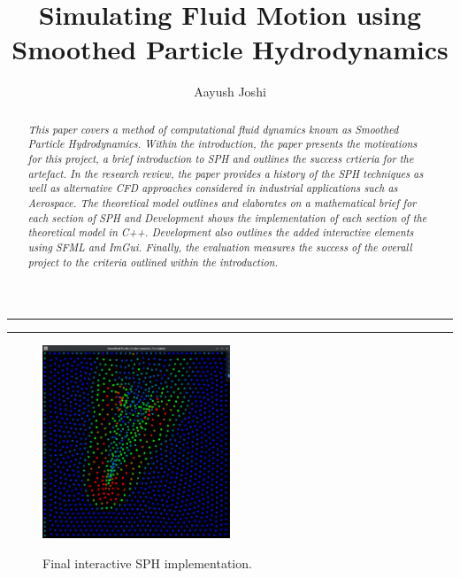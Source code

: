 \documentclass[a4paper,11pt]{article}
\title{\textbf{Simulating Fluid Motion using Smoothed Particle Hydrodynamics}}
\author{Aayush Joshi}
\date{}
\begin{document}
\maketitle
\par\noindent\rule{\textwidth}{0.3pt}

\begin{abstract}
\noindent \textit{This paper covers a method of computational fluid dynamics known as Smoothed Particle Hydrodynamics. Within the introduction, the paper presents the motivations for this project, a brief introduction to SPH and outlines the success crtieria for the artefact. In the research review, the paper provides a history of the SPH techniques as well as alternative CFD approaches considered in industrial applications such as Aerospace. The theoretical model outlines and elaborates on a mathematical brief for each section of SPH and Development shows the implementation of each section of the theoretical model in C++. Development also outlines the added interactive elements using SFML and ImGui. Finally, the evaluation measures the success of the overall project to the criteria outlined within the introduction.}
\end{abstract}

\par\noindent\rule{\textwidth}{0.3pt}
\begin{figure}[h]
\centering
 \includegraphics[width=0.5\textwidth]{mouse_drag.png} \par
 Final interactive SPH implementation.
\end{figure}

\newpage
\tableofcontents
\newpage
\begin{multicols}{2}

\pagebreak

\pagebreak

\pagebreak

\pagebreak

\pagebreak

\newpage
\nocite{*}

\end{multicols}
\pagebreak


\end{document}
